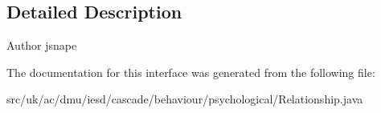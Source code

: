 \subsection{Detailed Description}
\begin{DoxyAuthor}{Author}
jsnape 
\end{DoxyAuthor}


The documentation for this interface was generated from the following file\-:\begin{DoxyCompactItemize}
\item 
src/uk/ac/dmu/iesd/cascade/behaviour/psychological/Relationship.\-java\end{DoxyCompactItemize}
